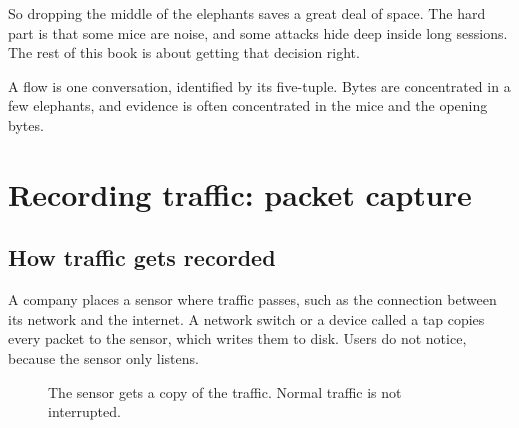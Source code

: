 So dropping the middle of the elephants saves a great deal of space. The hard part is that some mice are noise, and some attacks hide deep inside long sessions. The rest of this book is about getting that decision right.

\begin{recap}
A flow is one conversation, identified by its five-tuple. Bytes are concentrated in a few elephants, and evidence is often concentrated in the mice and the opening bytes.
\end{recap}

\chapter{Recording traffic: packet capture}

\section{How traffic gets recorded}
A company places a sensor where traffic passes, such as the connection between its network and the internet. A network switch or a device called a tap copies every packet to the sensor, which writes them to disk. Users do not notice, because the sensor only listens.

\begin{figure}[H]
\centering
{}
\caption{The sensor gets a copy of the traffic. Normal traffic is not interrupted.}
\end{figure}

